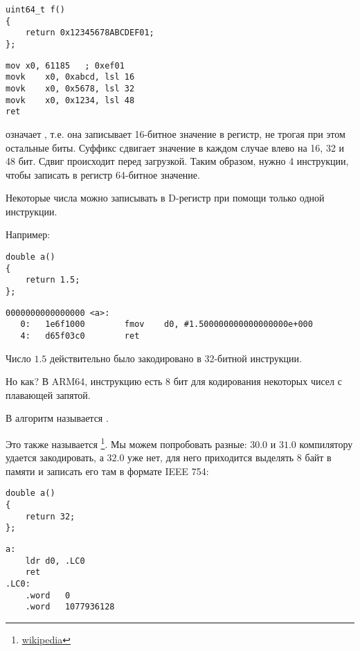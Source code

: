 
\begin{lstlisting}
uint64_t f()
{
	return 0x12345678ABCDEF01;
};
\end{lstlisting}

\begin{lstlisting}[caption=GCC 4.9.1 -O3]
mov	x0, 61185   ; 0xef01
movk	x0, 0xabcd, lsl 16
movk	x0, 0x5678, lsl 32
movk	x0, 0x1234, lsl 48
ret
\end{lstlisting}

 означает , т.е. она записывает 16-битное значение в регистр, не трогая
при этом остальные биты.
Суффикс  сдвигает значение в каждом случае влево на 16, 32 и 48 бит. Сдвиг происходит
перед загрузкой.
Таким образом, нужно 4 инструкции, чтобы записать в регистр 64-битное значение.


Некоторые числа можно записывать в D-регистр при помощи только одной инструкции.

Например:

\begin{lstlisting}
double a()
{
	return 1.5;
};
\end{lstlisting}

\begin{lstlisting}[caption=GCC 4.9.1 -O3 + objdump]
0000000000000000 <a>:
   0:   1e6f1000        fmov    d0, #1.500000000000000000e+000
   4:   d65f03c0        ret
\end{lstlisting}

Число $1.5$ действительно было закодировано в 32-битной инструкции.

Но как?
В ARM64, инструкцию  есть 8 бит для кодирования некоторых чисел с плавающей запятой.

В \ARMSixFourRefURL алгоритм называется .

Это также называется \footnote{\href{http://go.yurichev.com/17139}{wikipedia}}.
Мы можем попробовать разные: $30.0$ и $31.0$ компилятору удается закодировать, а $32.0$ уже нет, для него
приходится выделять 8 байт в памяти и записать его там в формате IEEE 754:

\begin{lstlisting}
double a()
{
	return 32;
};
\end{lstlisting}

\begin{lstlisting}[caption=GCC 4.9.1 -O3]
a:
	ldr	d0, .LC0
	ret
.LC0:
	.word	0
	.word	1077936128
\end{lstlisting}
